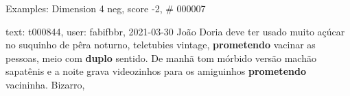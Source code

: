 \begin{frame}{Examples: Dimension 4 neg, score -2, \# 000007}
\footnotesize
\begin{alertblock}{text: t000844, user: fabifbbr, 2021-03-30}
João Doria deve ter usado muito açúcar no suquinho de pêra noturno, teletubies 
vintage, \textbf{prometendo} vacinar as pessoas, meio com \textbf{duplo} 
sentido. De manhã tom mórbido versão machão sapatênis e a noite grava 
videozinhos para os amiguinhos \textbf{prometendo} vacininha. Bizarro, 
\end{alertblock}
\end{frame}

